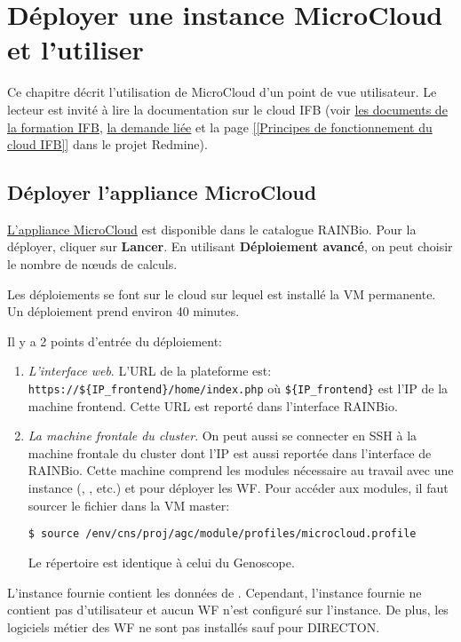 \chapter{Déployer une instance MicroCloud et l'utiliser} \label{chap:deploiement}

Ce chapitre décrit l'utilisation de MicroCloud d'un point de vue utilisateur.
Le lecteur est invité à lire la documentation sur le cloud IFB
(voir \href{https://intranet.genoscope.cns.fr/agc/redmine/documents/86}{les documents de la formation IFB},
\href{https://intranet.genoscope.cns.fr/agc/redmine/issues/6010}{la demande liée}
et la page \href{https://intranet.genoscope.cns.fr/agc/redmine/projects/microcloud/wiki/Principes_de_fonctionnement_du_cloud_IFB}{[[Principes de fonctionnement du cloud IFB]]}
dans le projet Redmine).

\section{Déployer l'appliance MicroCloud}

\href{https://biosphere.france-bioinformatique.fr/catalogue/appliance/150/}{L'appliance MicroCloud} est disponible dans le catalogue RAINBio.
Pour la déployer, cliquer sur \textbf{Lancer}.
En utilisant \textbf{Déploiement avancé}, on peut choisir le nombre de nœuds de calculs.

Les déploiements se font sur le cloud  sur lequel est installé la VM permanente.
Un déploiement prend environ 40 minutes.

\bigskip

Il y a 2 points d'entrée du déploiement:
\begin{enumerate}
    \item \emph{L'interface web}. L'URL de la plateforme est: \nolinkurl{https://${IP_frontend}/home/index.php} où \nolinkurl{${IP_frontend}}
          est l'IP de la machine frontend.
          Cette URL est reporté dans l'interface RAINBio.
    \item \emph{La machine frontale du cluster}. On peut aussi se connecter en SSH à la machine frontale du cluster
          dont l'IP est aussi reportée dans l'interface de RAINBio.
          Cette machine comprend les modules nécessaire au travail avec une instance (, , etc.)
          et  pour déployer les WF.
          Pour accéder aux modules, il faut sourcer le fichier  dans la VM master:
          \begin{lstlisting}[style=bash,gobble=14]
              $ source /env/cns/proj/agc/module/profiles/microcloud.profile
          \end{lstlisting}
            Le répertoire  est identique à celui du Genoscope.
\end{enumerate}
L'instance fournie contient les données de \theOrg{}.
Cependant, l'instance fournie ne contient pas d'utilisateur
et aucun WF n'est configuré sur l'instance.
De plus, les logiciels métier des WF ne sont pas installés
sauf pour DIRECTON.

